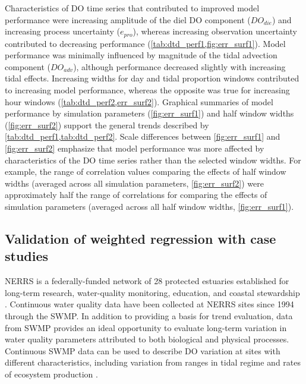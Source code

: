 \documentclass[letterpaper,12pt,oneside]{article}\usepackage[]{graphicx}\usepackage[]{color}
\begin{document}
Characteristics of \ac{DO} time series that contributed to improved model performance were increasing amplitude of the diel \ac{DO} component ($DO_{die}$) and increasing process uncertainty ($e_{pro}$), whereas increasing observation uncertainty contributed to decreasing performance (\cref{tab:dtd_perf1,fig:err_surf1}).  Model performance was minimally influenced by magnitude of the tidal advection component ($DO_{adv}$), although performance decreased slightly with increasing tidal effects.  Increasing widths for day and tidal proportion windows contributed to increasing model performance, whereas the opposite was true for increasing hour windows (\cref{tab:dtd_perf2,err_surf2}).  Graphical summaries of model performance by simulation parameters (\cref{fig:err_surf1}) and half window widths (\cref{fig:err_surf2}) support the general trends described by \cref{tab:dtd_perf1,tab:dtd_perf2}.  Scale differences between \cref{fig:err_surf1} and \cref{fig:err_surf2} emphasize that model performance was more affected by characteristics of the \ac{DO} time series rather than the selected window widths.  For example, the range of correlation values comparing the effects of half window widths (averaged across all simulation parameters, \cref{fig:err_surf2}) were approximately half the range of correlations for comparing the effects of simulation parameters (averaged across all half window widths, \cref{fig:err_surf1}).
 
\subsection{Validation of weighted regression with case studies}

\ac{NERRS} is a federally-funded network of 28 protected estuaries established for long-term research, water-quality monitoring, education, and coastal stewardship \citep{Wenner04}.  Continuous water quality data have been collected at \ac{NERRS} sites since 1994 through the \ac{SWMP}.  In addition to providing a basis for trend evaluation, data from \ac{SWMP} provides an ideal opportunity to evaluate long-term variation in water quality parameters attributed to both biological and physical processes.  Continuous \ac{SWMP} data can be used to describe \ac{DO} variation at sites with different characteristics, including variation from ranges in tidal regime \citep{Sanger02} and rates of ecosystem production \citep{Caffrey03,Caffrey04}.  
\end{document}
